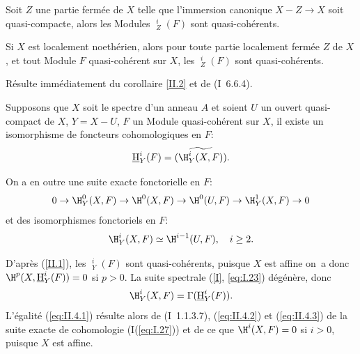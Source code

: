 \begin{supcorollaire} \label{II.2}
Soit $Z$ une partie ferm\'ee de $X$ telle que l'immersion canonique \hbox{$X-Z\to X$} soit quasi-compacte, alors les Modules ${\mathop{\underline{\mathrm{H}}}\nolimits}_Z^i(F)$ sont quasi-coh\'erents.
\end{supcorollaire}

\begin{supcorollaire} \label{II.3}
Si $X$ est localement noeth\'erien, alors pour toute partie localement ferm\'ee $Z$ de $X$, et tout Module $F$ quasi-coh\'erent sur $X$, les ${\mathop{\underline{\mathrm{H}}}\nolimits}_Z^i(F)$ sont quasi-coh\'erents.
\end{supcorollaire}

R\'esulte imm\'ediatement du corollaire \ref{II.2} et de (\EGA I~6.6.4).

\begin{supcorollaire} \label{II.4}
Supposons que $X$ soit le spectre d'un anneau $A$ et soient $U$ un ouvert quasi-compact de $X$, $Y=X-U$, $F$ un Module quasi-coh\'erent sur $X$, il existe un isomorphisme de foncteurs cohomologiques en $F$:
\begin{equation} \label{eq:II.4.1} {\mathop{\underline{\mathrm{H}}}\nolimits}_Y^i(F) = \widetilde{(\H_Y^i(X, F))}.
\end{equation}

On a en outre une suite exacte fonctorielle en $F$:
\begin{equation} \label{eq:II.4.2}
0 \to \H_Y^0(X, F) \to \H^0(X, F) \to \H^0(U, F) \to \H_Y^1(X, F) \to 0
\end{equation}
et des isomorphismes fonctoriels en $F$:
\begin{equation} \label{eq:II.4.3}
\H_Y^i(X, F) \simeq \H^{i-1}(U, F), \quad i\geq 2.
\end{equation}
\end{supcorollaire}

D'apr\`es (\ref{II.1}), les ${\mathop{\underline{\mathrm{H}}}\nolimits}_Y^i(F)$ sont quasi-coh\'erents, puisque $X$ est affine on~a donc $\H^p(X, {\mathop{\underline{\mathrm{H}}}\nolimits}_Y^i(F))=0$ si $p>0$. La suite spectrale (\ref{I}, \ref{eq:I.23}) d\'eg\'en\`ere, donc
$$
\H_Y^i(X, F) = \Gamma({\mathop{\underline{\mathrm{H}}}\nolimits}_Y^i(F)).
$$
L'\'egalit\'e (\ref{eq:II.4.1}) r\'esulte alors de (\EGA I~1.1.3.7), (\ref{eq:II.4.2}) et (\ref{eq:II.4.3}) de la suite exacte de cohomologie (I(\ref{eq:I.27})) et de ce que $\H^i(X, F)=0$ si $i>0$, puisque $X$ est affine.

